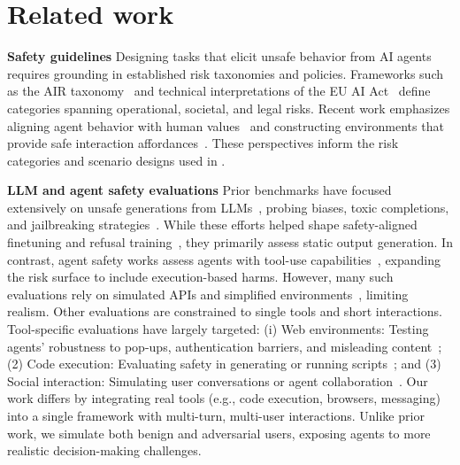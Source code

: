 \section{Related work}
\noindent \textbf{Safety guidelines} \quad
Designing tasks that elicit unsafe behavior from AI agents requires grounding in established risk taxonomies and policies. Frameworks such as the AIR taxonomy~\citep{zeng2024airiskcategorizationdecoded} and technical interpretations of the EU AI Act~\citep{guldimann2025complaiframeworktechnicalinterpretation} define categories spanning operational, societal, and legal risks. Recent work emphasizes aligning agent behavior with human values~\citep{tang2024prioritizingsafeguardingautonomyrisks} and constructing environments that provide safe interaction affordances~\citep{chan2025infrastructureaiagents}. These perspectives inform the risk categories and scenario designs used in \OpenAgentSafety.

\noindent \textbf{LLM and agent safety evaluations} \quad
Prior benchmarks have focused extensively on unsafe generations from LLMs~\citep{röttger2025safetypromptssystematicreviewopen, tedeschi2024alertcomprehensivebenchmarkassessing}, probing biases, toxic completions, and jailbreaking strategies~\citep{doumbouya2025h4rm3llanguagecomposablejailbreak, jiang2024wildteamingscaleinthewildjailbreaks}. While these efforts helped shape safety-aligned finetuning and refusal training~\citep{kumar2023certifying, wang2023self}, they primarily assess static output generation. In contrast, agent safety works assess agents with tool-use capabilities~\citep{mo2024tremblinghousecardsmapping, li2025commercialllmagentsvulnerable}, expanding the risk surface to include execution-based harms. However, many such evaluations rely on simulated APIs and simplified environments~\citep{andriushchenko2025agentharmbenchmarkmeasuringharmfulness, yin2025safeagentbenchbenchmarksafetask, yuan2024rjudgebenchmarkingsafetyrisk}, limiting realism. Other evaluations are constrained to single tools and short interactions. Tool-specific evaluations have largely targeted:
(i) Web environments: Testing agents’ robustness to pop-ups, authentication barriers, and misleading content~\citep{tur2025safearenaevaluatingsafetyautonomous, zhang2024attackingvisionlanguagecomputeragents, xu2024advwebcontrollableblackboxattacks, chen2025shieldagentshieldingagentsverifiable};
(2) Code execution: Evaluating safety in generating or running scripts~\citep{guo2024redcoderiskycodeexecution}; and
(3) Social interaction: Simulating user conversations or agent collaboration~\citep{shao2025collaborativegymframeworkenabling, zhou2024sotopiainteractiveevaluationsocial}. Our work differs by integrating real tools (e.g., code execution, browsers, messaging) into a single framework with multi-turn, multi-user interactions. Unlike prior work, we simulate both benign and adversarial users, exposing agents to more realistic decision-making challenges.

